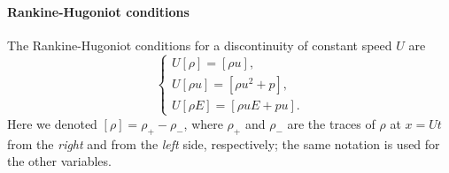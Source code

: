 \documentclass[10pt,a4paper]{article}
\numberwithin{equation}{section}
\newcommand{\ds}{\displaystyle}
\begin{document}
\paragraph{Rankine-Hugoniot conditions}
The Rankine-Hugoniot conditions for a discontinuity of constant speed $U$ are
\begin{equation}\label{eq:RH-n}
\left\{
\begin{array}{l}
U[\rho] = [\rho u],
\\
U\ds[\rho u] = [\rho u^2 + p],
\\
U\ds[\rho E] = [\rho u E + pu].
\end{array}
\right.
\end{equation}
Here we denoted $[\rho]=\rho_+-\rho_-$, where $\rho_+$ and $\rho_-$ are the traces of $\rho$ at $x=Ut$ from the {\em right} and from the {\em left} side, respectively; the same notation is used for the other variables.%
%
%
%
%
\end{document}
